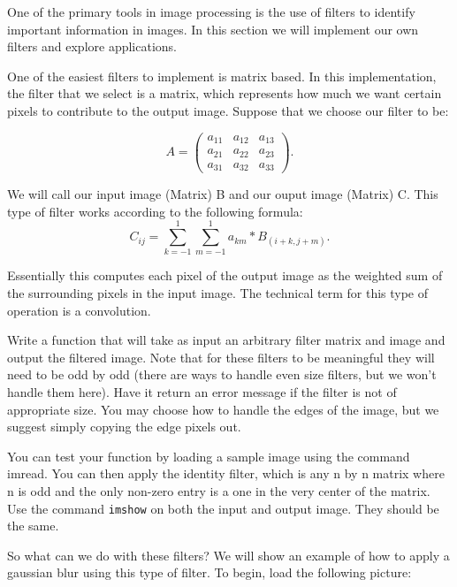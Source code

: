

One of the primary tools in image processing is the use of filters to identify important information in images. In this section we will implement our own filters and explore applications.

One of the easiest filters to implement is matrix based. In this implementation, the filter that we select is a matrix, which represents how much we want certain pixels to contribute to the output image. Suppose that we choose our filter to be:

\[
A = \begin{pmatrix}
a_{11}&a_{12}&a_{13}\\
a_{21}&a_{22}&a_{23}\\
a_{31}&a_{32}&a_{33}
\end{pmatrix}.
\]

We will call our input image (Matrix) B and our ouput image (Matrix) C. This type of filter works according to the following formula:
\[
C_{ij} = \sum_{k=-1}^1 \sum_{m=-1}^1 a_{km}*B_{(i+k,j+m)}.
\]

Essentially this computes each pixel of the output image as the weighted sum of the surrounding pixels in the input image. The technical term for this type of operation is a convolution.

\begin{problem}
Write a function that will take as input an arbitrary filter matrix and image and output the filtered image. Note that for these filters to be meaningful they will need to be odd by odd (there are ways to handle even size filters, but we won't handle them here). Have it return an error message if the filter is not of appropriate size. You may choose how to handle the edges of the image, but we suggest simply copying the edge pixels out.

You can test your function by loading a sample image using the command imread. You can then apply the identity filter, which is any n by n matrix where n is odd and the only non-zero entry is a one in the very center of the matrix. Use the command {\tt imshow} on both the input and output image. They should be the same.
\end{problem}

So what can we do with these filters? We will show an example of how to apply a gaussian blur using this type of filter. To begin, load the following picture:


